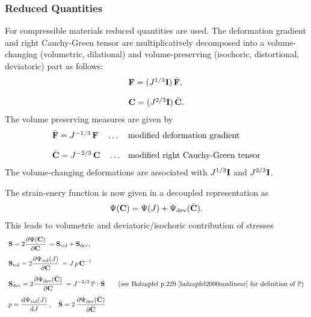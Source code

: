 \subsubsection{Reduced Quantities}

For compressible materials reduced quantities are used. The deformation gradient and right Cauchy-Green tensor are multiplicatively decomposed into a volume-changing (volumetric, dilational) and volume-preserving (isochoric, distortional, deviatoric) part as follows:
\begin{equation*}
  \begin{array}{lll}
    \textbf{F} = (J^{1/3}\textbf{I})\,\bar{\textbf{F}},\\[4mm]
    \textbf{C} = (J^{2/3}\textbf{I})\,\bar{\textbf{C}}.
  \end{array}
\end{equation*}
The volume preserving measures are given by
\begin{equation*}
  \begin{array}{lll}
    \bar{\textbf{F}} = J^{-1/3}\,\textbf{F} \quad \dots &\text{modified deformation gradient}\\[4mm]
    \bar{\textbf{C}} = J^{-2/3}\,\textbf{C} \quad \dots& \text{modified right Cauchy-Green tensor}
  \end{array}
\end{equation*}
The volume-changing deformations are associated with $J^{1/3}\textbf{I}$ and $J^{2/3}\textbf{I}$.

The strain-enery function is now given in a decoupled representation as
\begin{equation*}
  \begin{array}{lll}
    \Psi(\textbf{C}) = \Psi(J) + \Psi_\text{dev}(\bar{\textbf{C}}).
  \end{array}
\end{equation*}
This leads to volumetric and deviatoric/isochoric contribution of stresses
\begin{equation*}
  \begin{array}{lll}
    \bfS = 2\p{\Psi(\bfC)}{\bfC} = \bfS_\text{vol} + \bfS_\text{dev},\\[4mm]
    \bfS_\text{vol} = 2\p{\Psi_\text{vol}(J)}{\bfC} = J\,p\,\bfC^{-1}\\[4mm]
    \bfS_\text{dev} = 2\p{\Psi_\text{dev}(\bar{\bfC})}{\bfC} = J^{-2/3}\,\mathbb{P} : \bar{\bfS} \qquad \text{(see Holzapfel p.229 \cite{holzapfel2000nonlinear} for definition of $\mathbb{P}$)}\\[4mm]
    p = \d{\Psi_\text{vol}(J)}{J}, \quad \bar{\bfS} = 2\,\p{\Psi_\text{dev}(\bar{\bfC})}{\bar{\bfC}}
  \end{array}
\end{equation*}

